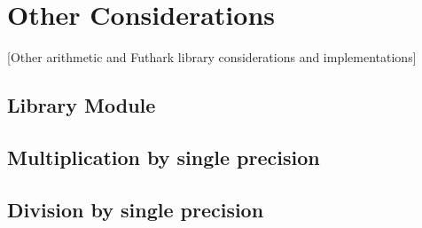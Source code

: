 \section{Other Considerations}
\label{sec:cons}
[Other arithmetic and Futhark library considerations and implementations]

\subsection{Library Module}

\subsection{Multiplication by single precision}

\subsection{Division by single precision}



